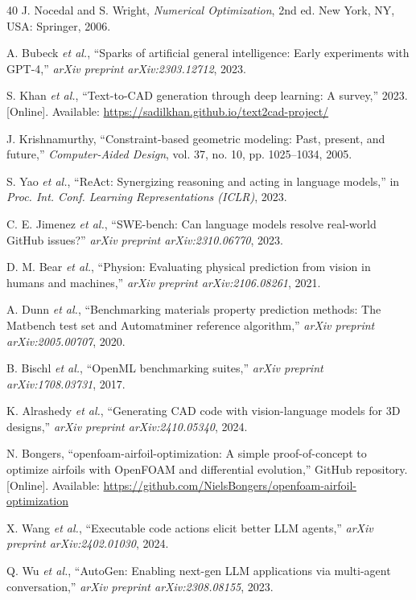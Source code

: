 \documentclass[conference]{IEEEtran}
\begin{document}
\begin{thebibliography}{40}
J. Nocedal and S. Wright, \emph{Numerical Optimization}, 2nd ed. New York, NY, USA: Springer, 2006.

A. Bubeck \emph{et al.}, ``Sparks of artificial general intelligence: Early experiments with GPT-4,'' \emph{arXiv preprint arXiv:2303.12712}, 2023.

S. Khan \emph{et al.}, ``Text-to-CAD generation through deep learning: A survey,'' 2023. [Online]. Available: \url{https://sadilkhan.github.io/text2cad-project/}

J. Krishnamurthy, ``Constraint-based geometric modeling: Past, present, and future,'' \emph{Computer-Aided Design}, vol. 37, no. 10, pp. 1025--1034, 2005.

S. Yao \emph{et al.}, ``ReAct: Synergizing reasoning and acting in language models,'' in \emph{Proc. Int. Conf. Learning Representations (ICLR)}, 2023.

C. E. Jimenez \emph{et al.}, ``SWE-bench: Can language models resolve real-world GitHub issues?'' \emph{arXiv preprint arXiv:2310.06770}, 2023.

D. M. Bear \emph{et al.}, ``Physion: Evaluating physical prediction from vision in humans and machines,'' \emph{arXiv preprint arXiv:2106.08261}, 2021.

A. Dunn \emph{et al.}, ``Benchmarking materials property prediction methods: The Matbench test set and Automatminer reference algorithm,'' \emph{arXiv preprint arXiv:2005.00707}, 2020.

B. Bischl \emph{et al.}, ``OpenML benchmarking suites,'' \emph{arXiv preprint arXiv:1708.03731}, 2017.

K. Alrashedy \emph{et al.}, ``Generating CAD code with vision-language models for 3D designs,'' \emph{arXiv preprint arXiv:2410.05340}, 2024.

N. Bongers, ``openfoam-airfoil-optimization: A simple proof-of-concept to optimize airfoils with OpenFOAM and differential evolution,'' GitHub repository. [Online]. Available: \url{https://github.com/NielsBongers/openfoam-airfoil-optimization}

X. Wang \emph{et al.}, ``Executable code actions elicit better LLM agents,'' \emph{arXiv preprint arXiv:2402.01030}, 2024.

Q. Wu \emph{et al.}, ``AutoGen: Enabling next-gen LLM applications via multi-agent conversation,'' \emph{arXiv preprint arXiv:2308.08155}, 2023.


\end{thebibliography}
\end{document}

